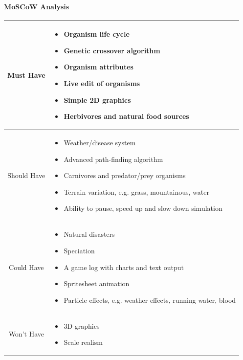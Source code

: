 \documentclass{ueacmpstyle}
\begin{document}
\paragraph{MoSCoW Analysis}
\begin{center}
	\begin{tabular}{c|p{}}
		Must Have & \begin{itemize}
						\item Organism life cycle
						\item Genetic crossover algorithm
						\item Organism attributes
						\item Live edit of organisms
						\item Simple 2D graphics
						\item Herbivores and natural food sources
					\end{itemize} \\ \hline
		Should Have & \begin{itemize}
						\item Weather/disease system
						\item Advanced path-finding algorithm
						\item Carnivores and predator/prey organisms
						\item Terrain variation, e.g. grass, mountainous, water
						\item Ability to pause, speed up and slow down simulation
					\end{itemize} \\ \hline
		Could Have & \begin{itemize}
						\item Natural disasters
						\item Speciation
						\item A game log with charts and text output
						\item Spritesheet animation
						\item Particle effects, e.g. weather effects, running water, blood
					\end{itemize} \\ \hline
		Won't Have & \begin{itemize}
						\item 3D graphics
						\item Scale realism
					\end{itemize} \\
	\end{tabular}
\end{center}
\end{document}
